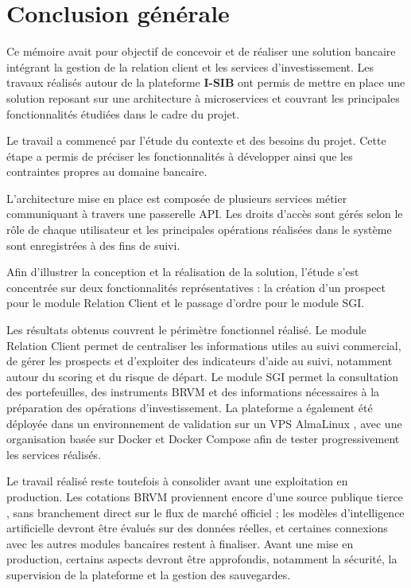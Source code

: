 
\chapter*{Conclusion générale}
{}

Ce mémoire avait pour objectif de concevoir et de réaliser une solution bancaire intégrant la gestion de la relation client et les services d'investissement. Les travaux réalisés autour de la plateforme \textbf{I-SIB} ont permis de mettre en place une solution reposant sur une architecture à microservices et couvrant les principales fonctionnalités étudiées dans le cadre du projet.


Le travail a commencé par l'étude du contexte et des besoins du projet. Cette étape a permis de préciser les fonctionnalités à développer ainsi que les contraintes propres au domaine bancaire.

L'architecture mise en place est composée de plusieurs services métier communiquant à travers une passerelle API. Les droits d'accès sont gérés selon le rôle de chaque utilisateur et les principales opérations réalisées dans le système sont enregistrées à des fins de suivi.

 Afin d'illustrer la conception et la réalisation de la solution, l'étude s'est concentrée sur deux fonctionnalités représentatives : la création d'un prospect pour le module Relation Client et le passage d'ordre pour le module SGI.



Les résultats obtenus couvrent le périmètre fonctionnel réalisé. Le module
Relation Client permet de centraliser les informations utiles au suivi
commercial, de gérer les prospects et d'exploiter des indicateurs d'aide au
suivi, notamment autour du scoring et du risque de départ. Le module SGI permet
la consultation des portefeuilles, des instruments BRVM \cite{brvm_actions} et des informations
nécessaires à la préparation des opérations d'investissement. La plateforme a
également été déployée dans un environnement de validation sur un VPS
AlmaLinux \cite{almalinux_official}, avec une organisation basée sur Docker \cite{docker_docs} et
Docker Compose \cite{docker_compose_docs} afin de tester progressivement les
services réalisés.

Le travail réalisé reste toutefois à consolider avant une exploitation en
production. Les cotations BRVM \cite{brvm_actions} proviennent encore d'une
source publique tierce \cite{brvm_data_public}, sans branchement direct sur le
flux de marché officiel ; les modèles d'intelligence artificielle devront être évalués sur des
données réelles, et certaines connexions avec les autres modules bancaires
restent à finaliser.
Avant une mise en production, certains aspects devront être approfondis, notamment la sécurité, la supervision de la plateforme et la gestion des sauvegardes.

